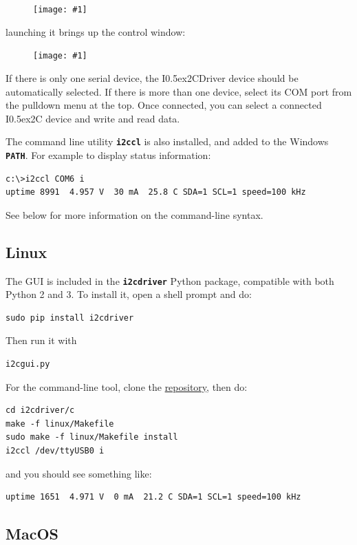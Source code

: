 \documentclass{article}
\newcommand{\two}{\raise0.5ex\hbox{\footnotesize{2}}}
\newcommand{\iic}{I\two{}C}
\newcommand{\iicdriver}{I\two{}CDriver}
\newcommand{\pngw}[2]{
\begin{figure}[H]
\begin{center}
\texttt{[image: \#1]}
\end{center}
\end{figure}
}
\newcommand{\mach}[1]{\texttt{\textbf{#1}}}
\begin{document}
\pngw{img/i2cdriver/win32-icon}{.3}

launching it brings up the control window:

\pngw{img/i2cdriver/win32-gui}{1.0}

If there is only one serial device, 
the \iicdriver{} device should be automatically selected.
If there is more than one device, select its COM port from the pulldown menu at the top.
Once connected, you can select a connected \iic{} device and write and read data. 

The command line utility \mach{i2ccl} is also installed,
and added to the Windows \mach{PATH}.
For example to display status information:

\begin{lstlisting}
c:\>i2ccl COM6 i
uptime 8991  4.957 V  30 mA  25.8 C SDA=1 SCL=1 speed=100 kHz
\end{lstlisting}

See below for more information on the command-line syntax.

\subsection{Linux}

The GUI is included in the \mach{i2cdriver} Python package, compatible with both Python 2 and 3.
To install it, open a shell prompt and do:

\begin{lstlisting}
sudo pip install i2cdriver
\end{lstlisting}

Then run it with

\begin{lstlisting}
i2cgui.py
\end{lstlisting}

For the command-line tool, clone the
\href{https://github.com/jamesbowman/i2cdriver}{repository},
then do:

\begin{lstlisting}
cd i2cdriver/c
make -f linux/Makefile
sudo make -f linux/Makefile install
i2ccl /dev/ttyUSB0 i
\end{lstlisting}

and you should see something like:

\begin{lstlisting}
uptime 1651  4.971 V  0 mA  21.2 C SDA=1 SCL=1 speed=100 kHz
\end{lstlisting}

\subsection{MacOS}
\end{document}
